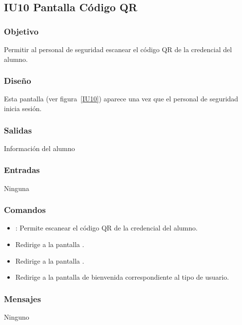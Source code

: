 \subsection{IU10 Pantalla Código QR}

\subsubsection{Objetivo}
Permitir al personal de seguridad escanear el código QR de la credencial del alumno.

\subsubsection{Diseño}
Esta pantalla  (ver figura~\ref{IU10}) aparece una vez que el personal de seguridad inicia sesión. 


\subsubsection{Salidas}
Información del alumno

\subsubsection{Entradas}
Ninguna

\subsubsection{Comandos}
\begin{itemize}
	\item {}: Permite escanear el código QR de la credencial del alumno.
	\item {} Redirige a la pantalla .
    \item {} Redirige a la pantalla .
    \item {} Redirige a la pantalla de bienvenida correspondiente al tipo de usuario.
\end{itemize}

\subsubsection{Mensajes}
Ninguno

